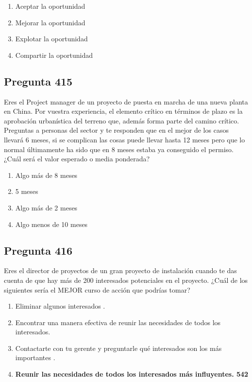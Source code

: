 \documentclass[11pt,a4paper]{article}
\begin{document}
\begin{enumerate}[label=\alph*)]
  \item Aceptar la oportunidad
  \item Mejorar la oportunidad
  \item Explotar la oportunidad
  \item Compartir la oportunidad
\end{enumerate}

\subsection*{Pregunta 415}
Eres el Project manager de un proyecto de puesta en marcha de una nueva planta en China. Por vuestra experiencia, el elemento crítico en términos de plazo es la aprobación urbanística del terreno que, además forma parte del camino crítico. Preguntas a personas del sector y te responden que en el mejor de los casos llevará 6 meses, si se complican las cosas puede llevar hasta 12 meses pero que lo normal últimamente ha sido que en 8 meses estaba ya conseguido el permiso. ¿Cuál será el valor esperado o media ponderada?

\begin{enumerate}[label=\alph*)]
  \item Algo más de 8 meses
  \item 5 meses
  \item Algo más de 2 meses
  \item Algo menos de 10 meses
\end{enumerate}

\subsection*{Pregunta 416}
Eres el director de proyectos de un gran proyecto de instalación cuando te das cuenta de que hay más de 200 interesados potenciales en el proyecto. ¿Cuál de los siguientes sería el MEJOR curso de acción que podrías tomar?

\begin{enumerate}[label=\alph*)]
  \item Eliminar algunos interesados .
  \item Encontrar una manera efectiva de reunir las necesidades de todos los interesados.
  \item Contactarte con tu gerente y preguntarle qué interesados son los más importantes .
  \item \textbf{Reunir las necesidades de todos los interesados más influyentes. 542}
\end{enumerate}
\end{document}

